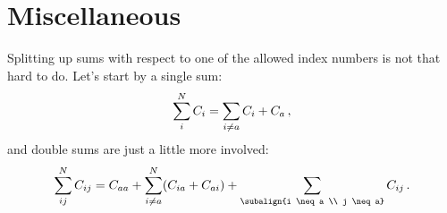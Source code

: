 \section{Miscellaneous}
    Splitting up sums with respect to one of the allowed index numbers is not that hard to do. Let's start by a single sum:
    \begin{equation}
        \sum_i^N C_i = \sum_{i \neq a} C_i + C_a \thinspace ,
    \end{equation}
    and double sums are just a little more involved:
    \begin{equation}
        \sum_{ij}^N C_{ij} = C_{aa}+ \sum_{i \neq a}^N (C_{ia} + C_{ai}) + \sum_{\subalign{i \neq a \\ j \neq a}} C_{ij} \thinspace .
    \end{equation}
